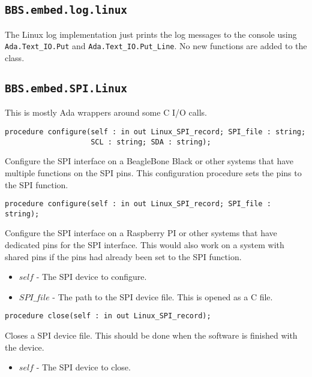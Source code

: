 \documentclass[10pt, openany]{book}
\newcommand{\indexfunc}[1]{\index[func]{#1}}
\newcommand{\package}[1]{\texttt{#1}}
\newcommand{\function}[1]{\texttt{#1}}
\newcommand{\comment}[1]{{\color{red}{#1}}}
\begin{document}
\subsection{\package{BBS.embed.log.linux}}
The Linux log implementation just prints the log messages to the console using \function{Ada.Text\_IO.Put} and \function{Ada.Text\_IO.Put\_Line}.  No new functions are added to the class.

\subsection{\package{BBS.embed.SPI.Linux}}
This is mostly Ada wrappers around some C I/O calls.

\begin{lstlisting}
procedure configure(self : in out Linux_SPI_record; SPI_file : string;
                    SCL : string; SDA : string);
\end{lstlisting}
\indexfunc{configure}
Configure the SPI interface on a BeagleBone Black or other systems that have multiple functions on the SPI pins.  This configuration procedure sets the pins to the SPI function.

\comment{This function is not yet implemented.  Do not attempt to use.}
\begin{lstlisting}
procedure configure(self : in out Linux_SPI_record; SPI_file : string);
\end{lstlisting}
\indexfunc{configure}
Configure the SPI interface on a Raspberry PI or other systems that have dedicated pins for the SPI interface.  This would also work on a system with shared pins if the pins had already been set to the SPI function.
\begin{itemize}
  \item $self$ - The SPI device to configure.
  \item $SPI\_file$ - The path to the SPI device file.  This is opened as a C file.
\end{itemize}

\begin{lstlisting}
procedure close(self : in out Linux_SPI_record);
\end{lstlisting}
\indexfunc{close}
Closes a SPI device file.  This should be done when the software is finished with the device.
\begin{itemize}
  \item $self$ - The SPI device to close.
\end{itemize}

\end{document}
